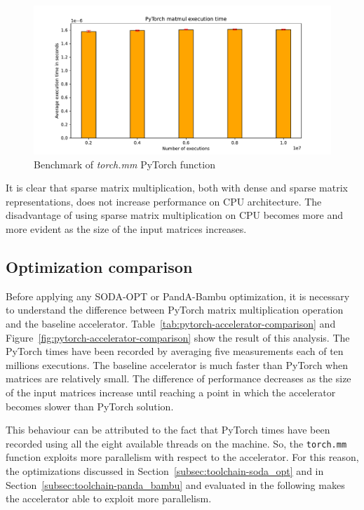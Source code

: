 \begin{figure}[t]
    \centering
    \includegraphics[height=0.4\textwidth]{Images/torch-mm_benchmark}
    \caption{Benchmark of \textit{torch.mm} PyTorch function}
    \label{fig:torch-mm_benchmark}
\end{figure}

It is clear that sparse matrix multiplication, both with dense and sparse matrix representations, does not increase performance on CPU architecture.
The disadvantage of using sparse matrix multiplication on CPU becomes more and more evident as the size of the input matrices increases.

\subsection{Optimization comparison}
\label{subsec:optimization-comparison}%

Before applying any SODA-OPT or PandA-Bambu optimization, it is necessary to understand the difference between PyTorch matrix multiplication operation and the baseline accelerator.
Table~\ref{tab:pytorch-accelerator-comparison} and Figure~\ref{fig:pytorch-accelerator-comparison} show the result of this analysis.
The PyTorch times have been recorded by averaging five measurements each of ten millions executions.
The baseline accelerator is much faster than PyTorch when matrices are relatively small.
The difference of performance decreases as the size of the input matrices increase until reaching a point in which the accelerator becomes slower than PyTorch solution.

This behaviour can be attributed to the fact that PyTorch times have been recorded using all the eight available threads on the machine.
So, the \lstinline{torch.mm} function exploits more parallelism with respect to the accelerator.
For this reason, the optimizations discussed in Section~\ref{subsec:toolchain-soda_opt} and in Section~\ref{subsec:toolchain-panda_bambu} and evaluated in the following makes the accelerator able to exploit more parallelism.

